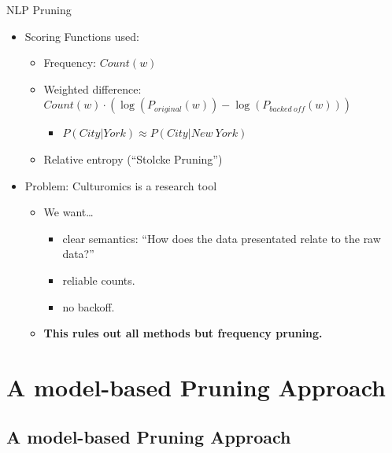 \documentclass[16:9,en,navbarinfooter]{sdqbeamer}
\begin{document}
\begin{frame}{NLP Pruning}
\vspace{1cm}
\begin{itemize}
    \item Scoring Functions used:
    \begin{itemize}
        \item Frequency: $Count(w)$
        \item Weighted difference: $Count(w) \cdot (\log(P_{original}(w)) - \log(P_{backed\ off}(w)))$%
            \begin{itemize}
                \item $P(City | York) \approx P(City | New\ York)$
            \end{itemize}
        \item Relative entropy (``Stolcke Pruning'')%
    \end{itemize}
    \item Problem: Culturomics is a research tool
    \begin{itemize}
        \item We want\dots
            \begin{itemize}
            \item clear semantics: ``How does the data presentated relate to the raw data?''
            \item reliable counts.
            \item no backoff.
            \end{itemize}
        \item \textbf{This rules out all methods but frequency pruning.}
    \end{itemize}
\end{itemize}

\end{frame}

\section{A model-based Pruning Approach}
\subsection{A model-based Pruning Approach}
\end{document}
